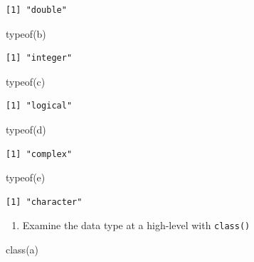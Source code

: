 \documentclass[
  letterpaper,
  DIV=11,
  numbers=noendperiod]{scrreprt}
\newenvironment{Shaded}{\begin{snugshade}}{\end{snugshade}}
\newcommand{\FunctionTok}[1]{\textcolor[rgb]{0.28,0.35,0.67}{#1}}
\newcommand{\NormalTok}[1]{\textcolor[rgb]{0.00,0.23,0.31}{#1}}
\providecommand{\tightlist}{%
  \setlength{\itemsep}{0pt}\setlength{\parskip}{0pt}}\usepackage{longtable,booktabs,array}
\begin{document}
\begin{verbatim}
[1] "double"
\end{verbatim}

\begin{Shaded}
\begin{Highlighting}[]
\FunctionTok{typeof}\NormalTok{(b)}
\end{Highlighting}
\end{Shaded}

\begin{verbatim}
[1] "integer"
\end{verbatim}

\begin{Shaded}
\begin{Highlighting}[]
\FunctionTok{typeof}\NormalTok{(c)}
\end{Highlighting}
\end{Shaded}

\begin{verbatim}
[1] "logical"
\end{verbatim}

\begin{Shaded}
\begin{Highlighting}[]
\FunctionTok{typeof}\NormalTok{(d)}
\end{Highlighting}
\end{Shaded}

\begin{verbatim}
[1] "complex"
\end{verbatim}

\begin{Shaded}
\begin{Highlighting}[]
\FunctionTok{typeof}\NormalTok{(e)}
\end{Highlighting}
\end{Shaded}

\begin{verbatim}
[1] "character"
\end{verbatim}

\begin{enumerate}
\def\labelenumi{\arabic{enumi}.}
\setcounter{enumi}{1}
\tightlist
\item
  Examine the data type at a high-level with \texttt{class()}
\end{enumerate}

\begin{Shaded}
\begin{Highlighting}[]
\FunctionTok{class}\NormalTok{(a)}
\end{Highlighting}
\end{Shaded}
\end{document}
